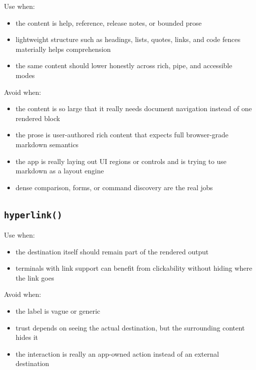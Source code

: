 Use when:

\begin{itemize}
\tightlist
\item
  the content is help, reference, release notes, or bounded prose
\item
  lightweight structure such as headings, lists, quotes, links, and code fences materially helps comprehension
\item
  the same content should lower honestly across rich, pipe, and accessible modes
\end{itemize}

Avoid when:

\begin{itemize}
\tightlist
\item
  the content is so large that it really needs document navigation instead of one rendered block
\item
  the prose is user-authored rich content that expects full browser-grade markdown semantics
\item
  the app is really laying out UI regions or controls and is trying to use markdown as a layout engine
\item
  dense comparison, forms, or command discovery are the real jobs
\end{itemize}

\subsection{\texorpdfstring{\texttt{h\allowbreak{}y\allowbreak{}p\allowbreak{}e\allowbreak{}r\allowbreak{}l\allowbreak{}i\allowbreak{}n\allowbreak{}k\allowbreak{}(\allowbreak{})}}{}}\label{record-023-hyperlink}

Use when:

\begin{itemize}
\tightlist
\item
  the destination itself should remain part of the rendered output
\item
  terminals with link support can benefit from clickability without hiding where the link goes
\end{itemize}

Avoid when:

\begin{itemize}
\tightlist
\item
  the label is vague or generic
\item
  trust depends on seeing the actual destination, but the surrounding content hides it
\item
  the interaction is really an app-owned action instead of an external destination
\end{itemize}

